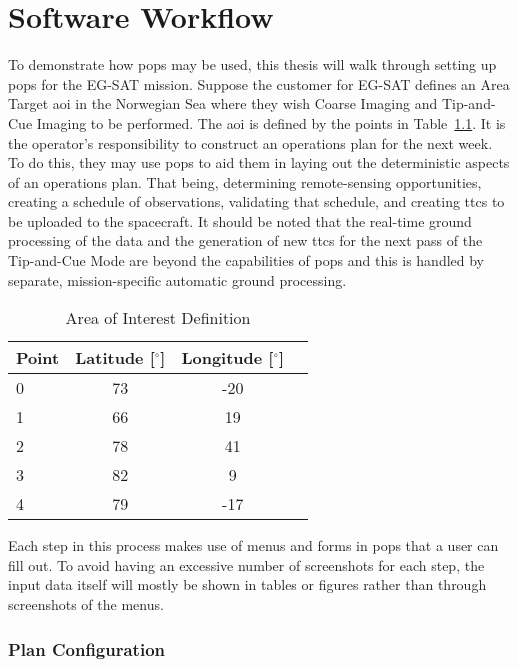 \glsresetall{} 


\chapter{Software Workflow}\label{chap:workflow}

\lettrine[lines=2, findent=0pt, nindent=5pt]{T}{}o demonstrate how \gls{pops}
may be used, this thesis will walk through setting up \gls{pops} for the EG-SAT
mission. Suppose the customer for EG-SAT defines an Area Target \gls{aoi} in
the Norwegian Sea where they wish Coarse Imaging and Tip-and-Cue Imaging to be
performed. The \gls{aoi} is defined by the points  in
Table~\ref{tab:norway-aoi}. It is the operator’s responsibility to construct an
operations plan for the next week. To do this, they may use \gls{pops} to aid
them in laying out the deterministic aspects of an operations plan.  That
being, determining remote-sensing opportunities, creating a schedule of
observations, validating that schedule, and creating \glspl{ttc} to be uploaded
to the spacecraft. It should be noted that the real-time ground processing of
the data and the generation of new \glspl{ttc} for the next pass of the
Tip-and-Cue Mode are beyond the capabilities of \gls{pops} and this is handled
by separate, mission-specific automatic ground processing.

\begin{table}[h] 
    \centering
    \caption{Area of Interest Definition}
    \begin{tabular}{cccc}
	Point                  & Latitude [$^\circ$] & Longitude [$^\circ$]  \\ \hline
	\multicolumn{1}{l|}{0} & 73       & -20       \\
	\multicolumn{1}{l|}{1} & 66       & 19        \\
	\multicolumn{1}{l|}{2} & 78       & 41        \\
	\multicolumn{1}{l|}{3} & 82       & 9         \\
	\multicolumn{1}{l|}{4} & 79       & -17      
    \end{tabular}
    \label{tab:norway-aoi}
\end{table}

Each step in this process makes use of menus and forms in \gls{pops} that a
user can fill out. To avoid having an excessive number of screenshots for each
step, the input data itself will mostly be shown in tables or figures rather than
through screenshots of the menus.

\subsection{Plan Configuration}

